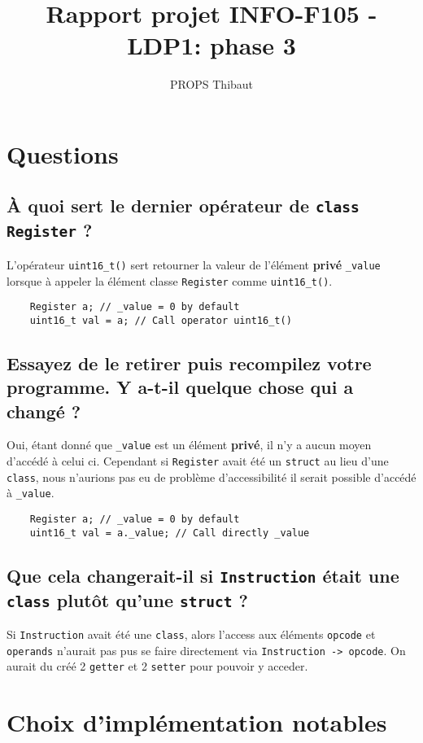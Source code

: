 \documentclass{article}
\title{Rapport projet INFO-F105 - LDP1: phase 3}
\author{PROPS Thibaut}
\date{}
\begin{document}
\maketitle

\section{Questions}

\subsection{À quoi sert le dernier opérateur de \texttt{class Register} ?}

L'opérateur \texttt{uint16_t()} sert retourner la valeur de l'élément \textbf{privé} \texttt{_value} lorsque à appeler la élément classe \texttt{Register} comme \texttt{uint16_t()}.

\begin{verbatim}
    Register a; // _value = 0 by default
    uint16_t val = a; // Call operator uint16_t()
\end{verbatim}


\subsection{Essayez de le retirer puis recompilez votre programme. Y a-t-il quelque chose qui a changé ?}

Oui, étant donné que \texttt{_value} est un élément \textbf{privé}, il n'y a aucun moyen d'accédé à celui ci. Cependant si \texttt{Register} avait été un \texttt{struct} au lieu d'une \texttt{class}, nous n'aurions pas eu de problème d'accessibilité il serait possible d'accédé à \texttt{_value}.

\begin{verbatim}
    Register a; // _value = 0 by default
    uint16_t val = a._value; // Call directly _value
\end{verbatim}

\subsection{Que cela changerait-il si \texttt{Instruction} était une \texttt{class} plutôt qu'une \texttt{struct} ?}

Si \texttt{Instruction} avait été une \texttt{class}, alors l'access aux éléments \texttt{opcode} et \texttt{operands} n'aurait pas pus se faire directement via \texttt{Instruction -> opcode}. On aurait du créé 2 \texttt{getter} et 2 \texttt{setter} pour pouvoir y acceder.

\section{Choix d'implémentation notables}
\end{document}
